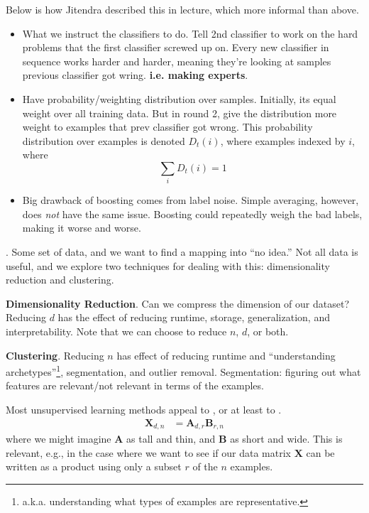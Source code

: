 \documentclass[12pt]{article}
\newcommand{\myspace}{\vspace{2\bigskipamount}}
\newcommand\p{\Needspace{10\baselineskip} \noindent}
\begin{document}
\myspace 
\p {} Below is how Jitendra described this in lecture, which more informal than above. \purple{ [52:00] }
\begin{itemize}
	\item What we instruct the classifiers to do. Tell 2nd classifier to work on the hard problems that the first classifier screwed up on. Every new classifier in sequence works harder and harder, meaning they're looking at samples previous classifier got wring. \textbf{i.e. making experts}. 
	
	\item Have probability/weighting distribution over samples. Initially, its equal weight over all training data. But in round 2, give the distribution more weight to examples that prev classifier got wrong. This probability distribution over examples is denoted $D_t(i)$, where examples indexed by $i$, where
	$$
	\sum_i D_t(i) = 1
	$$
	
	\item Big drawback of boosting comes from label noise. Simple averaging, however, does \textit{not} have the same issue. Boosting could repeatedly weigh the bad labels, making it worse and worse. 
\end{itemize} 




\p {}. Some set of data, and we want to find a mapping into ``no idea.'' Not all data is useful, and we explore two techniques for dealing with this: dimensionality reduction and clustering. 
\begin{compactitem}
	\item \textbf{Dimensionality Reduction}. Can we compress the dimension of our dataset? Reducing $d$ has the effect of reducing runtime, storage, generalization, and interpretability. Note that we can choose to reduce $n$, $d$, or both. 
	
	
	\item \textbf{Clustering}. Reducing $n$ has effect of reducing runtime and ``understanding archetypes''\footnote{a.k.a. understanding what types of examples are representative.}, segmentation, and outlier removal. Segmentation: figuring out what features are relevant/not relevant in terms of the examples.
\end{compactitem}
Most unsupervised learning methods appeal to , or at least to .
\begin{align}
\mathbf{X}_{d,n} &= \mathbf{A}_{d,r} \mathbf{B}_{r,n}
\end{align}
where we might imagine $\mathbf A$ as tall and thin, and $\mathbf{B}$ as short and wide. This is relevant, e.g., in the case where we want to see if our data matrix $\mathbf X$ can be written as a product using only a subset $r$ of the $n$ examples. \\
\end{document}
